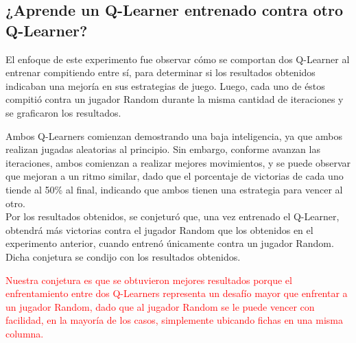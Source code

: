\subsection{¿Aprende un Q-Learner entrenado contra otro Q-Learner?}

El enfoque de este experimento fue observar cómo se comportan dos Q-Learner al entrenar compitiendo entre sí, para determinar si los resultados obtenidos indicaban una mejoría en sus estrategias de juego.
Luego, cada uno de éstos compitió contra un jugador Random durante la misma cantidad de iteraciones y se graficaron los resultados.


Ambos Q-Learners comienzan demostrando una baja inteligencia, ya que ambos realizan jugadas aleatorias al principio. Sin embargo, conforme avanzan las iteraciones, ambos comienzan a realizar mejores movimientos, y se puede observar que mejoran a un ritmo similar, dado que el porcentaje de victorias de cada uno tiende al 50\% al final, indicando que ambos tienen una estrategia para vencer al otro.\\

Por los resultados obtenidos, se conjeturó que, una vez entrenado el Q-Learner, obtendrá más victorias contra el jugador Random que los obtenidos en el experimento anterior, cuando entrenó únicamente contra un jugador Random.
Dicha conjetura se condijo con los resultados obtenidos.


\textcolor{red}{Nuestra conjetura es que se obtuvieron mejores resultados porque el enfrentamiento entre dos Q-Learners representa un desafío mayor que enfrentar a un jugador Random, dado que al jugador Random se le puede vencer con facilidad, en la mayoría de los casos, simplemente ubicando fichas en una misma columna.}
